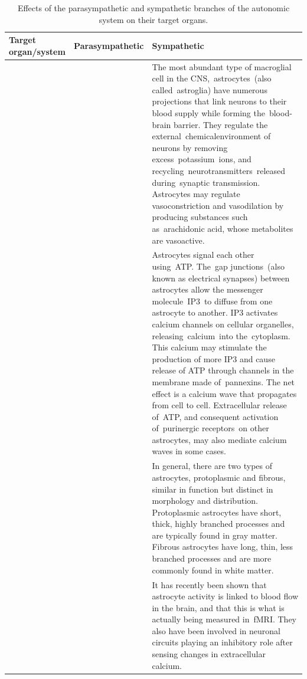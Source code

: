 \documentclass[]{book}
\begin{document}
\begin{longtable}[t]{>{\raggedright\arraybackslash}p{5em}>{\raggedright\arraybackslash}p{5em}>{\raggedright\arraybackslash}p{40em}}
\caption{\label{tab:autonomic}Effects of the parasympathetic and sympathetic branches of the autonomic system on their target organs.}\\
\toprule
Target organ/system & Parasympathetic & Sympathetic\\
\midrule
\rowcolor{gray!6}   &  & The most abundant type of macroglial cell in the CNS, astrocytes (also called astroglia) have numerous projections that link neurons to their blood supply while forming the blood-brain barrier. They regulate the external chemicalenvironment of neurons by removing excess potassium ions, and recycling neurotransmitters released during synaptic transmission. Astrocytes may regulate vasoconstriction and vasodilation by producing substances such as arachidonic acid, whose metabolites are vasoactive.\\

 &  & Astrocytes signal each other using ATP. The gap junctions (also known as electrical synapses) between astrocytes allow the messenger molecule IP3 to diffuse from one astrocyte to another. IP3 activates calcium channels on cellular organelles, releasing calcium into the cytoplasm. This calcium may stimulate the production of more IP3 and cause release of ATP through channels in the membrane made of pannexins. The net effect is a calcium wave that propagates from cell to cell. Extracellular release of ATP, and consequent activation of purinergic receptors on other astrocytes, may also mediate calcium waves in some cases.\\

\rowcolor{gray!6}   &  & In general, there are two types of astrocytes, protoplasmic and fibrous, similar in function but distinct in morphology and distribution. Protoplasmic astrocytes have short, thick, highly branched processes and are typically found in gray matter. Fibrous astrocytes have long, thin, less branched processes and are more commonly found in white matter.\\

 & \multirow{-4}{5em}{\raggedright\arraybackslash Astrocytes} & It has recently been shown that astrocyte activity is linked to blood flow in the brain, and that this is what is actually being measured in fMRI. They also have been involved in neuronal circuits playing an inhibitory role after sensing changes in extracellular calcium.\\


\end{longtable}
\end{document}
